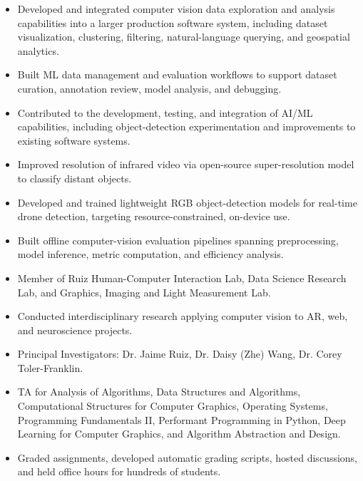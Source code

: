 \begin{itemize}
\item Developed and integrated computer vision data exploration and analysis capabilities into a larger production software system, including dataset visualization, clustering, filtering, natural-language querying, and geospatial analytics.
\item Built ML data management and evaluation workflows to support dataset curation, annotation review, model analysis, and debugging.
\item Contributed to the development, testing, and integration of AI/ML capabilities, including object-detection experimentation and improvements to existing software systems.
\end{itemize}
\begin{itemize}
\item Improved resolution of infrared video via open-source super-resolution model to classify distant objects.
\item Developed and trained lightweight RGB object-detection models for real-time drone detection, targeting resource-constrained, on-device use.
\item Built offline computer-vision evaluation pipelines spanning preprocessing, model inference, metric computation, and efficiency analysis.
\end{itemize}
\begin{itemize}
\item Member of Ruiz Human-Computer Interaction Lab, Data Science Research Lab, and Graphics, Imaging and Light Measurement Lab.
\item Conducted interdisciplinary research applying computer vision to AR, web, and neuroscience projects.
\item Principal Investigators: Dr. Jaime Ruiz, Dr. Daisy (Zhe) Wang, Dr. Corey Toler-Franklin.
\end{itemize}
\begin{itemize}
\item TA for Analysis of Algorithms, Data Structures and Algorithms, Computational Structures for Computer Graphics, Operating Systems, Programming Fundamentals II, Performant Programming in Python, Deep Learning for Computer Graphics, and Algorithm Abstraction and Design.
\item Graded assignments, developed automatic grading scripts, hosted discussions, and held office hours for hundreds of students.
\end{itemize}
